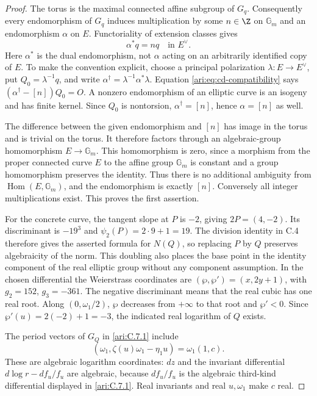 \begin{proof}
The torus is the maximal connected affine subgroup of $G_q$.
Consequently every endomorphism of $G_q$ induces multiplication
by some $n\in\Z$ on $\mathbb G_m$ and an endomorphism
$\alpha$ on $E$. Functoriality of extension classes gives
\begin{equation}\label{ari:eq:cd-compatibility}
 \alpha^*q=nq\quad\text{in }E^\vee.
\end{equation}
Here $\alpha^*$ is the dual endomorphism, not $\alpha$
acting on an arbitrarily identified copy of $E$. To make the
convention explicit, choose a principal polarization
$\lambda:E\to E^\vee$, put $Q_0=\lambda^{-1}q$, and
write $\alpha^\dagger=\lambda^{-1}\alpha^*\lambda$.
Equation \eqref{ari:eq:cd-compatibility} says
$(\alpha^\dagger-[n])Q_0=O$. A nonzero endomorphism of an
elliptic curve is an isogeny and has finite kernel. Since
$Q_0$ is nontorsion, $\alpha^\dagger=[n]$, hence
$\alpha=[n]$ as well.

The difference between the given endomorphism and $[n]$ has
image in the torus and is trivial on the torus. It therefore
factors through an algebraic-group homomorphism
$E\to\mathbb G_m$. This homomorphism is zero, since a
morphism from the proper connected curve $E$ to the affine
group $\mathbb G_m$ is constant and a group homomorphism
preserves the identity. Thus there is no additional ambiguity
from $\operatorname{Hom}(E,\mathbb G_m)$, and the
endomorphism is exactly $[n]$. Conversely all integer
multiplications exist. This proves the first assertion.

For the concrete curve, the tangent slope at $P$ is $-2$,
giving $2P=(4,-2)$. Its discriminant is $-19^3$ and
$\psi_2(P)=2\cdot9+1=19$. The division identity in C.4
therefore gives the asserted formula for $N(Q)$, so replacing
$P$ by $Q$ preserves algebraicity of the norm. This doubling
also places the base point in the identity component of the
real elliptic group without any component assumption. In the
chosen differential the Weierstrass coordinates are
$(\wp,\wp')=(x,2y+1)$, with $g_2=152$, $g_3=-361$.
The negative discriminant means that the real cubic has one
real root. Along $(0,\omega_1/2)$, $\wp$ decreases from
$+\infty$ to that root and $\wp'<0$. Since
$\wp'(u)=2(-2)+1=-3$, the indicated real logarithm of $Q$
exists.

The period vectors of $G_Q$ in \ref{ari:C.7.1} include
\[
 (\omega_1,\zeta(u)\omega_1-\eta_1u)
       =\omega_1(1,c).
\]
These are algebraic logarithm coordinates: $dz$ and the
invariant differential $d\log r-df_u/f_u$ are algebraic,
because $df_u/f_u$ is the algebraic third-kind differential
displayed in \ref{ari:C.7.1}. Real invariants and real $u,\omega_1$
make $c$ real.


\end{proof}
